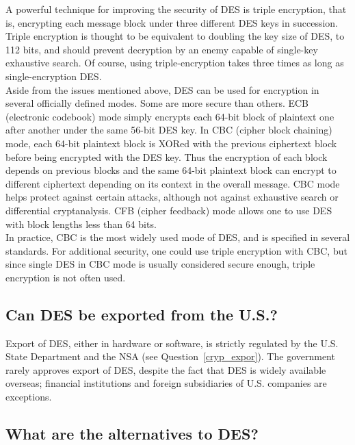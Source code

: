 A powerful technique for improving the security of DES is triple
encryption, that is, encrypting each message block under three
different DES keys in succession. Triple encryption is thought to be
equivalent to doubling the key size of DES, to 112 bits, and should
prevent decryption by an enemy capable of single-key exhaustive search.
Of course, using triple-encryption takes three times as long as
single-encryption DES.\\

Aside from the issues mentioned above, DES can be used for encryption
in several officially defined modes. Some are more secure than others.
ECB (electronic codebook) mode simply encrypts each 64-bit block of
plaintext one after another under the same 56-bit DES key. In CBC
(cipher block chaining) mode, each 64-bit plaintext block is XORed with
the previous ciphertext block before being encrypted with the DES key.
Thus the encryption of each block depends on previous blocks and the
same 64-bit plaintext block can encrypt to different ciphertext
depending on its context in the overall message. CBC mode helps protect
against certain attacks, although not against exhaustive search or
differential cryptanalysis. CFB (cipher feedback) mode allows one to
use DES with block lengths less than 64 bits.\\

In practice, CBC is the most widely used mode of DES, and is specified
in several standards. For additional security, one could use triple
encryption with CBC, but since single DES in CBC mode is usually
considered secure enough, triple encryption is not often used.

\subsection{Can DES be exported from the U.S.?}

Export of DES, either in hardware or software, is strictly regulated by the
U.S. State Department and the NSA (see Question~\ref{cryp_expor}). The
government rarely approves export of DES, despite the fact that DES is
widely available overseas; financial institutions and foreign subsidiaries
of U.S. companies are exceptions.

\subsection{What are the alternatives to DES?}
\label{what_alter_des}

